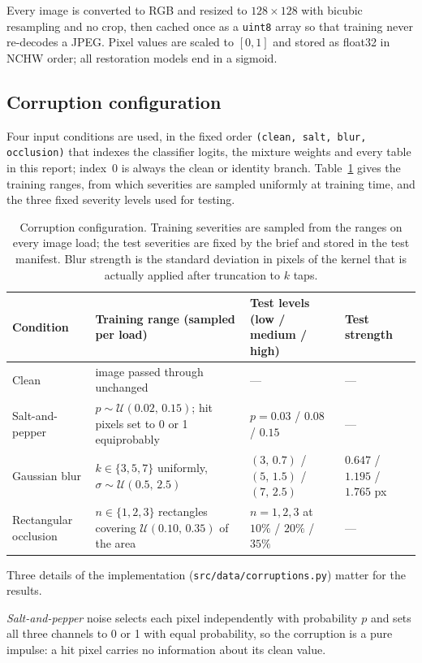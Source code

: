 \documentclass[conference]{IEEEtran}
\begin{document}
Every image is converted to RGB and resized to $128 \times 128$ with bicubic
resampling and no crop, then cached once as a \texttt{uint8} array so that
training never re-decodes a JPEG. Pixel values are scaled to $[0,1]$ and stored
as float32 in NCHW order; all restoration models end in a sigmoid.

\subsection{Corruption configuration}

Four input conditions are used, in the fixed order
\texttt{(clean, salt, blur, occlusion)} that indexes the classifier logits, the
mixture weights and every table in this report; index~0 is always the clean or
identity branch. Table~\ref{tab:corruptions} gives the training ranges, from
which severities are sampled uniformly at training time, and the three fixed
severity levels used for testing.

\begin{table}[t]
\caption{Corruption configuration. Training severities are sampled from the
ranges on every image load; the test severities are fixed by the brief and
stored in the test manifest. Blur strength is the standard deviation in pixels
of the kernel that is actually applied after truncation to $k$ taps.}
\label{tab:corruptions}
\centering
\begin{tabular}{@{}llll@{}}
\toprule
Condition & Training range (sampled per load) & Test levels (low / medium / high) & Test strength \\
\midrule
Clean & image passed through unchanged & --- & --- \\
Salt-and-pepper & $p \sim \mathcal{U}(0.02,\,0.15)$; hit pixels set to 0 or 1 equiprobably & $p = 0.03$ / $0.08$ / $0.15$ & --- \\
Gaussian blur & $k \in \{3,5,7\}$ uniformly, $\sigma \sim \mathcal{U}(0.5,\,2.5)$ & $(3,\,0.7)$ / $(5,\,1.5)$ / $(7,\,2.5)$ & $0.647$ / $1.195$ / $1.765$ px \\
Rectangular occlusion & $n \in \{1,2,3\}$ rectangles covering $\mathcal{U}(0.10,\,0.35)$ of the area & $n=1,2,3$ at $10\%$ / $20\%$ / $35\%$ & --- \\
\bottomrule
\end{tabular}
\end{table}

Three details of the implementation (\texttt{src/data/corruptions.py}) matter for
the results.

\emph{Salt-and-pepper} noise selects each pixel independently with probability
$p$ and sets all three channels to 0 or 1 with equal probability, so the
corruption is a pure impulse: a hit pixel carries no information about its clean
value.
\end{document}
